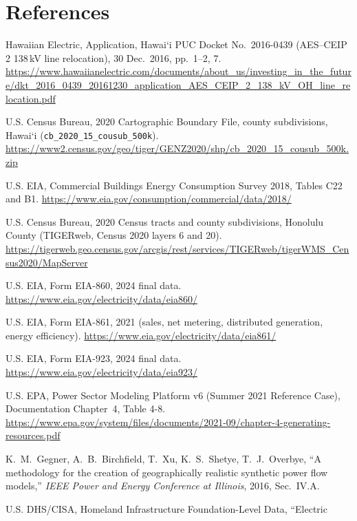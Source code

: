\documentclass[11pt,a4paper]{article}
\newcommand{\okina}{\textquoteleft}
\begin{document}
\section*{References}
\begin{small}\sloppy
\begin{description}[leftmargin=4.2em,style=sameline,itemsep=2pt]
\item[{[AES]}] Hawaiian Electric, Application, Hawai\okina i PUC Docket No.\ 2016-0439
  (AES--CEIP 2 138\,kV line relocation), 30 Dec.\ 2016, pp.~1--2, 7.
  \url{https://www.hawaiianelectric.com/documents/about_us/investing_in_the_future/dkt_2016_0439_20161230_application_AES_CEIP_2_138_kV_OH_line_relocation.pdf}
\item[{[CB]}] U.S. Census Bureau, 2020 Cartographic Boundary File, county subdivisions,
  Hawai\okina i (\texttt{cb\_2020\_15\_cousub\_500k}).
  \url{https://www2.census.gov/geo/tiger/GENZ2020/shp/cb_2020_15_cousub_500k.zip}
\item[{[CBECS]}] U.S. EIA, Commercial Buildings Energy Consumption Survey 2018, Tables
  C22 and B1. \url{https://www.eia.gov/consumption/commercial/data/2018/}
\item[{[CEN]}] U.S. Census Bureau, 2020 Census tracts and county subdivisions, Honolulu
  County (TIGERweb, Census 2020 layers 6 and 20).
  \url{https://tigerweb.geo.census.gov/arcgis/rest/services/TIGERweb/tigerWMS_Census2020/MapServer}
\item[{[EIA860]}] U.S. EIA, Form EIA-860, 2024 final data.
  \url{https://www.eia.gov/electricity/data/eia860/}
\item[{[EIA861]}] U.S. EIA, Form EIA-861, 2021 (sales, net metering, distributed
  generation, energy efficiency). \url{https://www.eia.gov/electricity/data/eia861/}
\item[{[EIA923]}] U.S. EIA, Form EIA-923, 2024 final data.
  \url{https://www.eia.gov/electricity/data/eia923/}
\item[{[EPA]}] U.S. EPA, Power Sector Modeling Platform v6 (Summer 2021 Reference Case),
  Documentation Chapter~4, Table 4-8.
  \url{https://www.epa.gov/system/files/documents/2021-09/chapter-4-generating-resources.pdf}
\item[{[GEG]}] K.~M.~Gegner, A.~B.~Birchfield, T.~Xu, K.~S.~Shetye, T.~J.~Overbye,
  ``A methodology for the creation of geographically realistic synthetic power flow
  models,'' \emph{IEEE Power and Energy Conference at Illinois}, 2016, Sec.~IV.A.
\item[{[HIFLD]}] U.S. DHS/CISA, Homeland Infrastructure Foundation-Level Data, ``Electric

\end{description}
\end{small}
\end{document}
